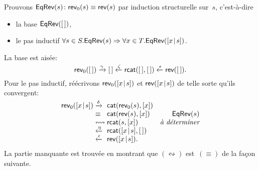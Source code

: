 Prouvons \label{EqRev} \(\textsf{EqRev}({s}) \colon \textsf{rev}_0(s) \equiv
\textsf{rev}(s)\)
par induction
structurelle sur~\(s\), c'est-à-dire
\begin{itemize}

  \item la base \(\textsf{EqRev}({[\,]})\),

  \item le pas inductif \(\forall s \in S.\textsf{EqRev}({s}) \Rightarrow
    \forall x \in T.\textsf{EqRev}({[{x}\!\mid\!{s}]})\).

\end{itemize}
La base est aisée:
\begin{equation*}
  \fun{rev}_0(\el) \xrightarrow{\smash{\gamma}} \el
  \xleftarrow{\smash{\zeta}} \fun{rcat}(\el,\el)
  \xleftarrow{\smash{\epsilon}}
  \fun{rev}(\el).
  \index{rev0@\fun{rev\(_0\)/1}}
\end{equation*}
Pour le pas inductif, réécrivons \(\textsf{rev}_0([{x}\!\mid\!{s}])\) et
\(\textsf{rev}([{x}\!\mid\!{s}])\) de telle sorte qu'ils convergent:
\begin{equation*}
\begin{array}{@{}r@{\;}l@{\;}lr@{}}
  \fun{rev}_0(\cons{x}{s})
& \xrightarrow{\smash{\delta}}
& \fun{cat}(\fun{rev}_0(s),[x])\\
& \equiv
& \fun{cat}(\fun{rev}(s),[x])
& \IH{\pred{EqRev}{s}}\\
& \leftrightsquigarrow
& \fun{rcat}(s,[x])
& \IH{\emph{à déterminer}}\\
& \xleftarrow{\smash{\eta}}
& \fun{rcat}(\cons{x}{s},\el)\\
& \xleftarrow{\smash{\epsilon}}
& \fun{rev}(\cons{x}{s}).
\end{array}
\end{equation*}
La partie manquante est trouvée en montrant que
\((\leftrightsquigarrow)\) est~\((\equiv)\) de la façon
suivante.

